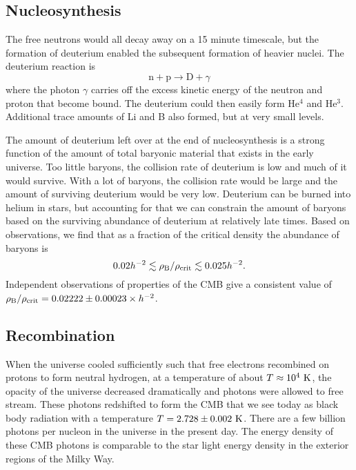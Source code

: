\documentclass[]{article}
\begin{document}
\subsection{Nucleosynthesis}

The free neutrons would all decay away on a 15 minute timescale, but
the formation of deuterium enabled the subsequent formation of heavier
nuclei. The deuterium reaction is
\begin{equation}
\mathrm{n} + \mathrm{p} \to \mathrm{D} + \gamma
\end{equation}
\noindent
where the photon $\gamma$ carries off the excess kinetic energy of the
neutron and proton that become bound. The deuterium could then easily
form He$^{4}$ and He$^{3}$. Additional trace amounts of Li and B also
formed, but at very small levels.

The amount of deuterium left over at the end of nucleosynthesis is 
a strong function of the amount of total baryonic material that exists
in the early universe.  Too little baryons, the collision rate of deuterium
is low and much of it would survive. With a lot of baryons, the collision
rate would be large and the amount of surviving deuterium would be very low.
Deuterium can be burned into helium in stars, but accounting for that
we can constrain the amount of baryons based on the surviving abundance
of deuterium at relatively late times.  Based on observations, we find
that as a fraction of the critical density the abundance of baryons is
\begin{equation}
0.02h^{-2} \lesssim \rho_{\mathrm{B}} / \rho_{\mathrm{crit}} \lesssim 0.025h^{-2}.
\end{equation}
Independent observations of properties of the CMB give a consistent
value of $\rho_{\mathrm{B}} / \rho_{\mathrm{crit}} = 0.02222\pm0.00023 \times h^{-2}$.

\subsection{Recombination}

When the universe cooled sufficiently such that free electrons recombined on 
protons to form neutral hydrogen, at a temperature of about 
$T\approx10^{4}~\mathrm{K}$, the opacity of the universe decreased dramatically and 
photons were allowed to free stream. These photons redshifted to form the
CMB that we see today as black body radiation with a temperature 
$T=2.728\pm0.002~\mathrm{K}$. There are a few billion photons per nucleon in the
universe in the present day. The energy density of these CMB photons is
comparable to the star light energy density in the exterior regions of the
Milky Way.
\end{document}
